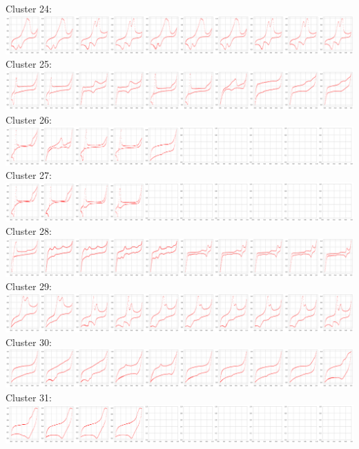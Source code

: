 Cluster 24:\\
\includegraphics[width=1.0\textwidth]{figures/clusters/cv_cluster24.png}
Cluster 25:\\
\includegraphics[width=1.0\textwidth]{figures/clusters/cv_cluster25.png}
Cluster 26:\\
\includegraphics[width=1.0\textwidth]{figures/clusters/cv_cluster26.png}
Cluster 27:\\
\includegraphics[width=1.0\textwidth]{figures/clusters/cv_cluster27.png}
Cluster 28:\\
\includegraphics[width=1.0\textwidth]{figures/clusters/cv_cluster28.png}
Cluster 29:\\
\includegraphics[width=1.0\textwidth]{figures/clusters/cv_cluster29.png}
Cluster 30:\\
\includegraphics[width=1.0\textwidth]{figures/clusters/cv_cluster30.png}
Cluster 31:\\
\includegraphics[width=1.0\textwidth]{figures/clusters/cv_cluster31.png}

